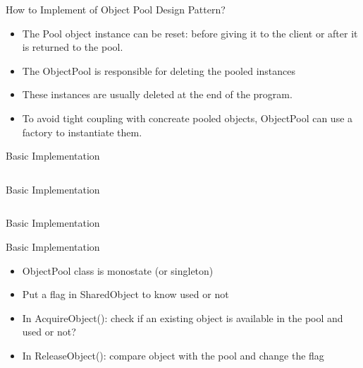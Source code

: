\documentclass[13pt]{beamer}
\begin{document}
\begin{frame}{How to Implement of Object Pool Design Pattern?}
	\begin{itemize}
		\setlength\itemsep{1em}
		\item The Pool object instance can be reset: before giving it to the client or after it is returned to the pool.
		\item The ObjectPool is responsible for deleting the pooled instances
		\item These instances are usually deleted at the end of the program.
		\item To avoid tight coupling with concreate pooled objects, ObjectPool can use a factory to instantiate them.
	\end{itemize}
\end{frame}

\begin{frame}{Basic Implementation}
\begin{columns}[T]
\begin{column}{.45\textwidth}

\end{column}

\begin{column}{.45\textwidth}

\end{column}
\end{columns}
\end{frame}

\begin{frame}{Basic Implementation}
\begin{columns}[T]
\begin{column}{.45\textwidth}

\end{column}

\begin{column}{.45\textwidth}

\end{column}
\end{columns}
\end{frame}

\begin{frame}{Basic Implementation}

\end{frame}

\begin{frame}{Basic Implementation}
	\begin{itemize}
		\setlength\itemsep{1em}
		\item ObjectPool class is monostate (or singleton)
		\item Put a flag in SharedObject to know used or not
		\item In AcquireObject(): check if an existing object is available in the pool and used or not?
		\item In ReleaseObject(): compare object with the pool and change the flag
	\end{itemize}
\end{frame}
\end{document}
